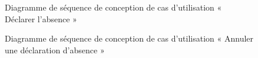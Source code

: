 \begin{figure}[H]
  \centering
  \caption{Diagramme de séquence de conception de cas d'utilisation «  Déclarer l'absence »}
  \label{fig:conception_sequence_declare_absence}
\end{figure}

\begin{figure}[H]
  \centering
  \caption{Diagramme de séquence de conception de cas d'utilisation « Annuler une déclaration d'absence »}
  \label{fig:conception_sequence_annuler_absence}
\end{figure}

